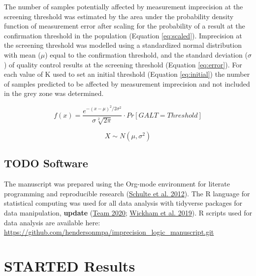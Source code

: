 \documentclass[review]{elsarticle}
\begin{document}
The number of samples potentially affected by measurement imprecision
at the screening threshold was estimated by the area under the
probability density function of measurement error after scaling for
the probability of a result at the confirmation threshold in the
population (Equation \ref{eq:scaled}). Imprecision at the screening
threshold was modelled using a standardized normal distribution with
mean (\(\mu\)) equal to the confirmation threshold, and the standard
deviation (\(\sigma\)) of quality control results at the screening
threshold (Equation \ref{eq:error}). For each value of K used to set
an initial threshold (Equation \ref{eq:initial}) the number of samples
predicted to be affected by measurement imprecision and not included
in the grey zone was determined.

\begin{equation}\label{eq:scaled}
f(x) = \frac{e^{-(x-\mu)^2/2\sigma^2}}{\sigma \sqrt[2]{2\pi}} \cdot Pr[GALT = Threshold] 
\end{equation}

\begin{equation}\label{eq:error}
X \sim N(\mu, \sigma^2)
\end{equation}

\subsection*{{\bfseries\sffamily TODO} Software}
\label{sec:org39f8a28}
The manuscript was prepared using the Org-mode environment for
literate programming and reproducible research (\hyperlink{citeproc_bib_item_1}{Schulte et al. 2012}). The R language for statistical computing was used
for all data analysis with tidyverse packages for data manipulation,
\textbf{update} (\hyperlink{citeproc_bib_item_2}{Team 2020}; \hyperlink{citeproc_bib_item_3}{Wickham et al. 2019}). R scripts used for data
analysis are available here:
\url{https://github.com/hendersonmpa/imprecision\_logic\_manuscript.git}

\section*{{\bfseries\sffamily STARTED} Results}
\label{sec:org35078e4}
\end{document}
